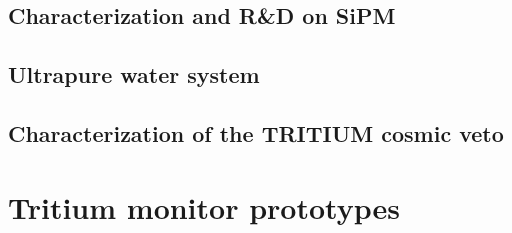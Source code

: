 \documentclass[12pt,a4paper]{book}
\begin{document}
	\section[Characterization SiPM]{Characterization and R\&D on SiPM}\label{sec:CharacterizationSiPM}
	
	\newpage
	
	\section{Ultrapure water system}\label{sec:CharacterizationUltraPureWaterSystem}
	
					 
	\section[Characterization of the cosmic veto]{Characterization of the TRITIUM cosmic veto}\label{sec:TritiumActiveVeto}
	
	\newpage
		
	
					 

\chapter{Tritium monitor prototypes}\label{chap:Prototypes}	
\end{document}
